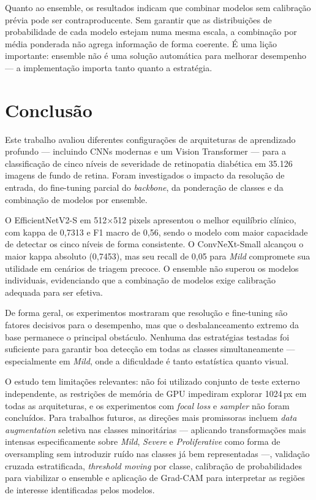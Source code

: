 \documentclass[conference]{IEEEtran}
\begin{document}
Quanto ao ensemble, os resultados indicam que combinar modelos sem
calibra\c{c}\~ao pr\'evia pode ser contraproducente. Sem garantir que
as distribui\c{c}\~oes de probabilidade de cada modelo estejam numa
mesma escala, a combina\c{c}\~ao por m\'edia ponderada n\~ao agrega
informa\c{c}\~ao de forma coerente. \'E uma li\c{c}\~ao importante:
ensemble n\~ao \'e uma solu\c{c}\~ao autom\'atica para melhorar
desempenho --- a implementa\c{c}\~ao importa tanto quanto a estrat\'egia.

\section{Conclus\~ao}

Este trabalho avaliou diferentes configura\c{c}\~oes de arquiteturas de
aprendizado profundo --- incluindo CNNs modernas e um Vision Transformer
--- para a classifica\c{c}\~ao de cinco n\'iveis de severidade de
retinopatia diab\'etica em 35.126 imagens de fundo de retina. Foram
investigados o impacto da resolu\c{c}\~ao de entrada, do fine-tuning
parcial do \textit{backbone}, da pondera\c{c}\~ao de classes e da
combina\c{c}\~ao de modelos por ensemble.

O EfficientNetV2-S em 512$\times$512 pixels apresentou o melhor
equil\'ibrio cl\'inico, com kappa de 0,7313 e F1 macro de 0,56, sendo
o modelo com maior capacidade de detectar os cinco n\'iveis de forma
consistente. O ConvNeXt-Small alcan\c{c}ou o maior kappa absoluto
(0,7453), mas seu recall de 0,05 para \textit{Mild} compromete sua
utilidade em cen\'arios de triagem precoce. O ensemble n\~ao superou os
modelos individuais, evidenciando que a combina\c{c}\~ao de modelos
exige calibra\c{c}\~ao adequada para ser efetiva.

De forma geral, os experimentos mostraram que resolu\c{c}\~ao e
fine-tuning s\~ao fatores decisivos para o desempenho, mas que o
desbalanceamento extremo da base permanece o principal obst\'aculo.
Nenhuma das estrat\'egias testadas foi suficiente para garantir boa
detec\c{c}\~ao em todas as classes simultaneamente --- especialmente em
\textit{Mild}, onde a dificuldade \'e tanto estat\'istica quanto visual.

O estudo tem limita\c{c}\~oes relevantes: n\~ao foi utilizado conjunto
de teste externo independente, as restri\c{c}\~oes de mem\'oria de GPU
impediram explorar 1024\,px em todas as arquiteturas, e os experimentos
com \textit{focal loss} e \textit{sampler} n\~ao foram conclu\'idos.
Para trabalhos futuros, as dire\c{c}\~oes mais promissoras incluem
\textit{data augmentation} seletiva nas classes minorit\'arias ---
aplicando transforma\c{c}\~oes mais intensas especificamente sobre
\textit{Mild}, \textit{Severe} e \textit{Proliferative} como forma de
oversampling sem introduzir ru\'ido nas classes j\'a bem representadas
---, valida\c{c}\~ao cruzada estratificada, \textit{threshold moving}
por classe, calibra\c{c}\~ao de probabilidades para viabilizar o ensemble
e aplica\c{c}\~ao de Grad-CAM para interpretar as regi\~oes de interesse
identificadas pelos modelos.
\end{document}
